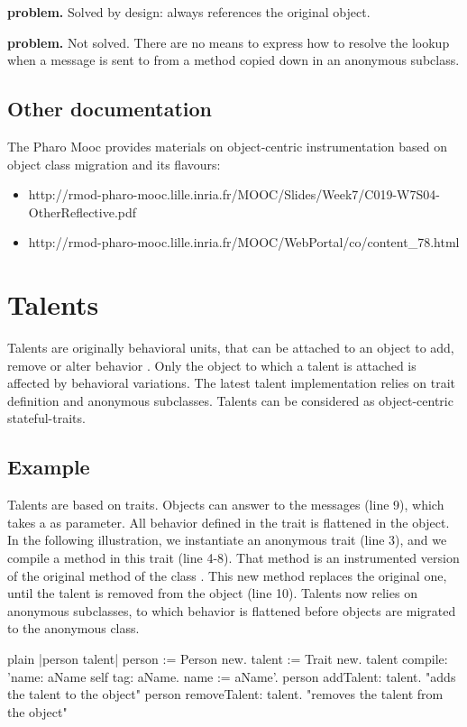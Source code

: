 \documentclass[10pt,twoside,english]{_support/latex/sbabook/sbabook}
\begin{document}
\textbf{ problem.} Solved by design:  always references the original object.

\textbf{ problem.} Not solved. There are no means to express how to resolve the lookup when a message is sent to  from a method copied down in an anonymous subclass.
\section{Other documentation}
The Pharo Mooc provides materials on object-centric instrumentation based on object class migration and its flavours:

\begin{itemize}
\item http://rmod-pharo-mooc.lille.inria.fr/MOOC/Slides/Week7/C019-W7S04-OtherReflective.pdf
\item http://rmod-pharo-mooc.lille.inria.fr/MOOC/WebPortal/co/content\_78.html
\end{itemize}
\chapter{Talents}
Talents are originally behavioral units, that can be attached to an object to add, remove or alter behavior \cite{ressia2014talents}. Only the object to which a talent is attached is affected by behavioral variations. The latest talent implementation relies on trait definition and anonymous subclasses. Talents can be considered as object-centric stateful-traits.
\section{Example}
Talents are based on traits. Objects can answer to the  messages (line 9), which takes a  as parameter. All behavior defined in the trait is flattened in the object. In the following illustration, we instantiate an anonymous trait (line 3), and we compile a method in this trait (line 4-8). That method is an instrumented version of the original  method of the class . This new method replaces the original one, until the talent is removed from the object (line 10). Talents now relies on anonymous subclasses, to which behavior is flattened before objects are migrated to the anonymous class.

\begin{displaycode}{plain}
|person talent|
  person := Person new.
	talent := Trait new.
	talent
		compile:
			'name: aName
	       self tag: aName.
	       name := aName'.
	person addTalent: talent. "adds the talent to the object"
  person removeTalent: talent. "removes the talent from the object"
\end{displaycode}
\end{document}
